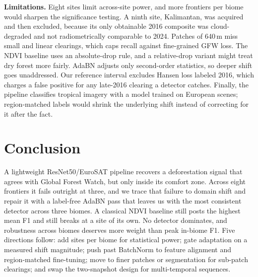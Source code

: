 \documentclass[journal]{IEEEtran}
\begin{document}
\textbf{Limitations.} Eight sites limit across-site power, and more frontiers per
biome would sharpen the significance testing. A ninth site, Kalimantan, was acquired
and then excluded, because its only obtainable 2016 composite was cloud-degraded and
not radiometrically comparable to 2024. Patches of 640\,m miss small and linear
clearings, which caps recall against fine-grained GFW loss. The NDVI baseline uses an
absolute-drop rule, and a relative-drop variant might treat dry forest more fairly.
AdaBN adjusts only second-order statistics, so deeper shift goes unaddressed. Our
reference interval excludes Hansen loss labeled 2016, which charges a false positive
for any late-2016 clearing a detector catches. Finally, the pipeline classifies
tropical imagery with a model trained on European scenes; region-matched labels would
shrink the underlying shift instead of correcting for it after the fact.

\section{Conclusion}
A lightweight ResNet50/EuroSAT pipeline recovers a deforestation signal that agrees
with Global Forest Watch, but only inside its comfort zone. Across eight frontiers
it fails outright at three, and we trace that failure to domain shift and repair it
with a label-free AdaBN pass that leaves us with the most consistent detector across
three biomes. A classical NDVI baseline still posts the highest mean F1 and still
breaks at a site of its own. No detector dominates, and robustness across biomes
deserves more weight than peak in-biome F1. Five directions follow: add sites per
biome for statistical power; gate adaptation on a measured shift magnitude; push
past BatchNorm to feature alignment and region-matched fine-tuning; move to finer
patches or segmentation for sub-patch clearings; and swap the two-snapshot design
for multi-temporal sequences.
\end{document}
